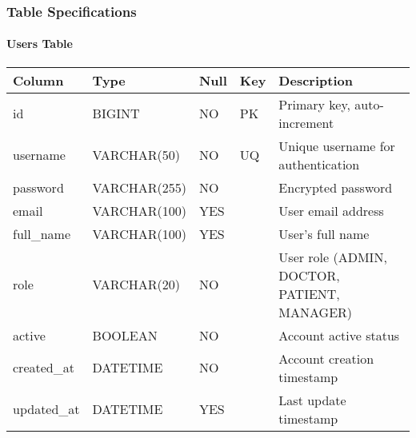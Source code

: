 \documentclass[12pt,a4paper]{article}
\begin{document}
\subsubsection{Table Specifications}

\paragraph{Users Table}
\begin{longtable}{|p{3cm}|p{2cm}|p{2cm}|p{2cm}|p{5cm}|}
\hline
\textbf{Column} & \textbf{Type} & \textbf{Null} & \textbf{Key} & \textbf{Description} \\
\hline
id & BIGINT & NO & PK & Primary key, auto-increment \\
\hline
username & VARCHAR(50) & NO & UQ & Unique username for authentication \\
\hline
password & VARCHAR(255) & NO & & Encrypted password \\
\hline
email & VARCHAR(100) & YES & & User email address \\
\hline
full\_name & VARCHAR(100) & YES & & User's full name \\
\hline
role & VARCHAR(20) & NO & & User role (ADMIN, DOCTOR, PATIENT, MANAGER) \\
\hline
active & BOOLEAN & NO & & Account active status \\
\hline
created\_at & DATETIME & NO & & Account creation timestamp \\
\hline
updated\_at & DATETIME & YES & & Last update timestamp \\
\hline
\end{longtable}
\end{document}
